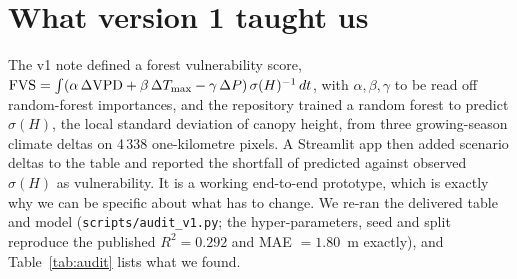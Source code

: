 \section{What version 1 taught us}\label{sec:audit}

The v1 note defined a forest vulnerability score, $\mathrm{FVS}=\int(\alpha\,\Delta\mathrm{VPD}+\beta\,\Delta T_{\max}-\gamma\,\Delta P)\,\sigma(H)^{-1}\,dt$, with $\alpha,\beta,\gamma$ to be read off random-forest importances, and the repository trained a random forest to predict $\sigma(H)$, the local standard deviation of canopy height, from three growing-season climate deltas on 4\,338 one-kilometre pixels. A Streamlit app then added scenario deltas to the table and reported the shortfall of predicted against observed $\sigma(H)$ as vulnerability. It is a working end-to-end prototype, which is exactly why we can be specific about what has to change. We re-ran the delivered table and model (\texttt{scripts/audit\_v1.py}; the hyper-parameters, seed and split reproduce the published $R^2=0.292$ and MAE $=1.80$~m exactly), and Table~\ref{tab:audit} lists what we found.

